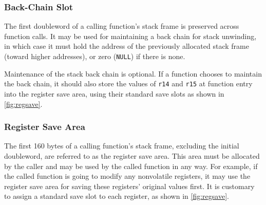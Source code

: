\documentclass[english,11pt,twoside,toc=bib,toc=idx]{scrreprt}
\newcommand{\STACKSIZE}{160}
\newcommand{\STACKSIZE}{96}
\begin{document}
\subsubsection{Back-Chain Slot}
The first {\ifzseries double\fi}word of a calling function's stack frame
is preserved across function calls.  It may be used for maintaining a back
chain for stack unwinding, in which case it must hold the address of the
previously allocated stack frame (toward higher addresses), or zero
(\texttt{NULL}) if there is none.

Maintenance of the stack back chain is optional.  If a function chooses to
maintain the back chain, it should also store the values of \texttt{r14}
and \texttt{r15} at function entry into the register save area, using
their standard save slots as shown in \cref{fig:regsave}.

\subsubsection{Register Save Area}
The first \STACKSIZE{} bytes of a calling function's stack frame,
excluding the initial {\ifzseries double\fi}word, are referred to as the
register save area.  This area must be allocated by the caller and may be
used by the called function in any way.  For example, if the called
function is going to modify any nonvolatile registers, it may use the
register save area for saving these registers' original values first.  It
is customary to assign a standard save slot to each register, as shown in
\cref{fig:regsave}.
\end{document}
